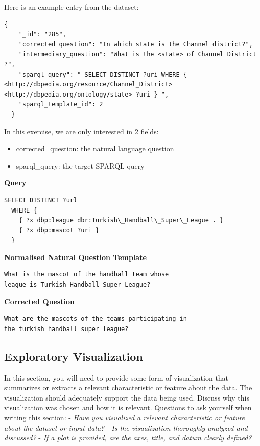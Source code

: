 \documentclass[12pt]{article}
\begin{document}
Here is an example entry from the dataset:

\begin{lstlisting}[]
  {
    "_id": "285", 
    "corrected_question": "In which state is the Channel district?", 
    "intermediary_question": "What is the <state> of Channel District ?", 
    "sparql_query": " SELECT DISTINCT ?uri WHERE { <http://dbpedia.org/resource/Channel_District> <http://dbpedia.org/ontology/state> ?uri } ", 
    "sparql_template_id": 2
  }
\end{lstlisting}

In this exercise, we are only interested in 2 fields:

\begin{itemize}
  \item corrected\_question: the natural language question
  \item sparql\_query: the target SPARQL query
\end{itemize}

\textbf{Query}
\begin{lstlisting}[language=SPARQL]
  SELECT DISTINCT ?url
  WHERE {
    { ?x dbp:league dbr:Turkish\_Handball\_Super\_League . }
    { ?x dbp:mascot ?uri }
  }
\end{lstlisting}

\textbf{Normalised Natural Question Template}
\begin{lstlisting}[]
What is the mascot of the handball team whose
league is Turkish Handball Super League?
\end{lstlisting}

\textbf{Corrected Question}
\begin{lstlisting}[]
What are the mascots of the teams participating in
the turkish handball super league?
\end{lstlisting}

\subsection{Exploratory Visualization}\label{exploratory-visualization}

In this section, you will need to provide some form of visualization
that summarizes or extracts a relevant characteristic or feature about
the data. The visualization should adequately support the data being
used. Discuss why this visualization was chosen and how it is relevant.
Questions to ask yourself when writing this section: - \emph{Have you
visualized a relevant characteristic or feature about the dataset or
input data?} - \emph{Is the visualization thoroughly analyzed and
discussed?} - \emph{If a plot is provided, are the axes, title, and
datum clearly defined?}
\end{document}

